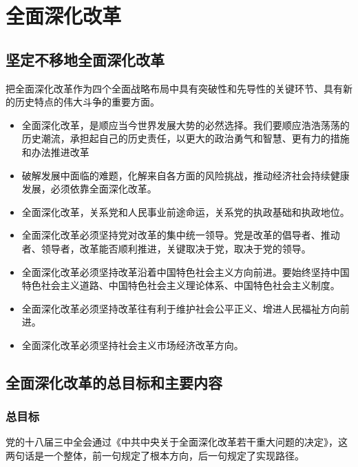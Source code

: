 \section{全面深化改革}
    \subsection{坚定不移地全面深化改革}
        把全面深化改革作为四个全面战略布局中具有突破性和先导性的关键环节、具有新的历史特点的伟大斗争的重要方面。
        \begin{itemize}
            \item 全面深化改革，是顺应当今世界发展大势的必然选择。我们要顺应浩浩荡荡的历史潮流，承担起自己的历史责任，以更大的政治勇气和智慧、更有力的措施和办法推进改革
            \item {}破解发展中面临的难题，化解来自各方面的风险挑战，推动经济社会持续健康发展，必须依靠全面深化改革。
            \item 全面深化改革，关系党和人民事业前途命运，关系党的执政基础和执政地位。
        \end{itemize}

        \begin{itemize}
            \item 全面深化改革必须坚持党对改革的集中统一领导。党是改革的倡导者、推动者、领导者，改革能否顺利推进，关键取决于党，取决于党的领导。
            \item 全面深化改革必须坚持改革沿着中国特色社会主义方向前进。要始终坚持中国特色社会主义道路、中国特色社会主义理论体系、中国特色社会主义制度。
            \item 全面深化改革必须坚持改革往有利于维护社会公平正义、增进人民福祉方向前进。
            \item 全面深化改革必须坚持社会主义市场经济改革方向。
        \end{itemize}

    \subsection{全面深化改革的总目标和主要内容}
        \subsubsection{总目标}
            党的十八届三中全会通过《中共中央关于全面深化改革若干重大问题的决定》，这两句话是一个整体，前一句规定了根本方向，后一句规定了实现路径。


